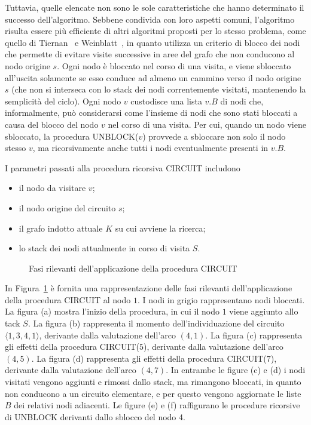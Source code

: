 Tuttavia, quelle elencate non sono le sole caratteristiche che hanno determinato il successo dell'algoritmo.
Sebbene condivida con loro aspetti comuni, l'algoritmo risulta essere pi\`u efficiente di altri algoritmi
proposti per lo stesso problema, come quello di Tiernan~\cite{10.1145/362814.362819} e
Weinblatt~\cite{10.1145/321679.321684}, in quanto utilizza un criterio di blocco
dei nodi che permette di evitare visite successive in aree del grafo che non conducono al nodo origine $s$.
Ogni nodo \`e bloccato nel corso di una visita, e viene sbloccato all'uscita solamente se esso conduce ad almeno
un cammino verso il nodo origine $s$ (che non si interseca con lo stack dei nodi correntemente visitati, mantenendo
la semplicit\`a del ciclo).
Ogni nodo $v$ custodisce una lista $v.B$ di nodi che, informalmente, pu\`o considerarsi come l'insieme di nodi
che sono stati bloccati a causa del blocco del nodo $v$ nel corso di una visita.
Per cui, quando un nodo viene sbloccato, la procedura UNBLOCK($v$) provvede a sbloccare non solo il nodo stesso $v$,
ma ricorsivamente anche tutti i nodi eventualmente presenti in $v.B$.



\newpage

I parametri passati alla procedura ricorsiva CIRCUIT includono
\begin{itemize}
    \item il nodo da visitare $v$;
    \item il nodo origine del circuito $s$;
    \item il grafo indotto attuale $K$ su cui avviene la ricerca;
    \item lo stack dei nodi attualmente in corso di visita $S$.
\end{itemize}




\begin{figure}
    \centering
    
\caption{Fasi rilevanti dell'applicazione della procedura CIRCUIT}\label{fig:circuit-example}
\end{figure}

In Figura~\ref{fig:circuit-example} \`e fornita una rappresentazione delle fasi rilevanti dell'applicazione della
procedura CIRCUIT al nodo $1$. I nodi in grigio rappresentano nodi bloccati.
La figura (a) mostra l'inizio della procedura, in cui il nodo $1$ viene aggiunto allo tack $S$.
La figura (b) rappresenta il momento dell'individuazione del circuito $\langle 1, 3, 4, 1 \rangle$, derivante dalla valutazione
dell'arco $(4, 1)$.
La figura (c) rappresenta gli effetti della procedura CIRCUIT($5$), derivante dalla valutazione dell'arco $(4, 5)$.
La figura (d) rappresenta gli effetti della procedura CIRCUIT($7$), derivante dalla valutazione dell'arco $(4, 7)$.
In entrambe le figure (c) e (d) i nodi visitati vengono aggiunti e rimossi dallo stack, ma rimangono bloccati,
in quanto non conducono a un circuito elementare, e per questo vengono aggiornate le liste $B$ dei relativi
nodi adiacenti.
Le figure (e) e (f) raffigurano le procedure ricorsive di UNBLOCK derivanti dallo sblocco del nodo 4.

